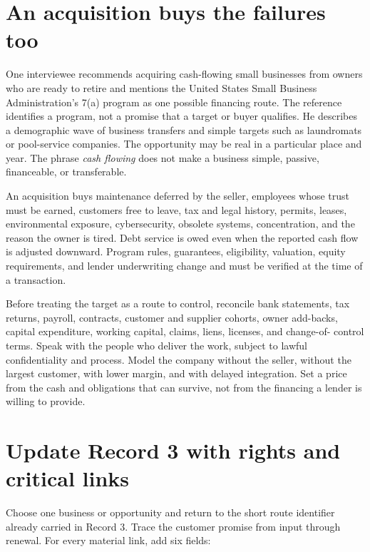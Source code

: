 \section{An acquisition buys the failures too}

One interviewee recommends acquiring cash-flowing small businesses from owners
who are ready to retire and mentions the United States Small Business
Administration's 7(a) program as one possible financing route. The reference
identifies a program, not a promise that a target or buyer qualifies. He
describes a demographic wave of business transfers and simple targets such as
laundromats or pool-service companies. The opportunity may be real in a
particular place and year. The phrase \textit{cash flowing} does not make a
business simple, passive, financeable,
or transferable.

An acquisition buys maintenance deferred by the seller, employees whose trust
must be earned, customers free to leave, tax and legal history, permits,
leases, environmental exposure, cybersecurity, obsolete systems, concentration,
and the reason the owner is tired. Debt service is owed even when the reported
cash flow is adjusted downward. Program rules, guarantees, eligibility,
valuation, equity requirements, and lender underwriting change and must be
verified at the time of a transaction.

Before treating the target as a route to control, reconcile bank statements,
tax returns, payroll, contracts, customer and supplier cohorts, owner add-backs,
capital expenditure, working capital, claims, liens, licenses, and change-of-
control terms. Speak with the people who deliver the work, subject to lawful
confidentiality and process. Model the company without the seller, without the
largest customer, with lower margin, and with delayed integration. Set a price
from the cash and obligations that can survive, not from the financing a lender
is willing to provide.

\section{Update Record 3 with rights and critical links}

\enlargethispage{2\baselineskip}

Choose one business or opportunity and return to the short route identifier
already carried in Record 3. Trace the customer promise from input through
renewal. For every material link, add six fields:

